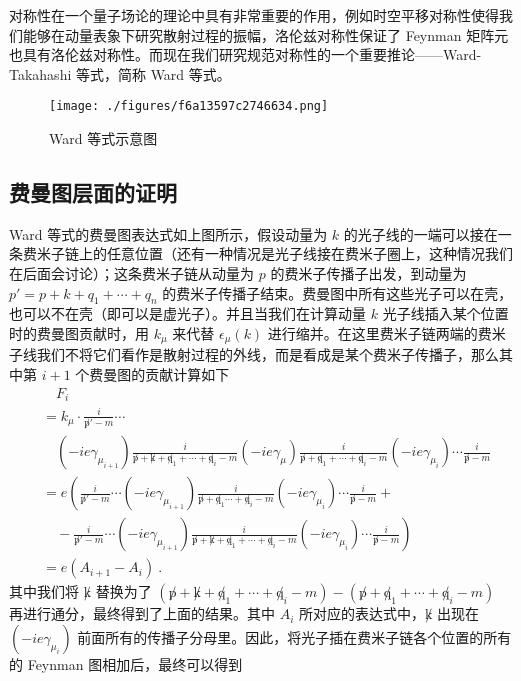 对称性在一个量子场论的理论中具有非常重要的作用，例如时空平移对称性使得我们能够在动量表象下研究散射过程的振幅，洛伦兹对称性保证了 Feynman 矩阵元也具有洛伦兹对称性。而现在我们研究规范对称性的一个重要推论——Ward-Takahashi 等式，简称 Ward 等式。

\begin{figure}[ht]
\centering
\texttt{[image: ./figures/f6a13597c2746634.png]}
\caption{Ward 等式示意图} \label{fig_ward_4}
\end{figure}

\subsection{费曼图层面的证明}
Ward 等式的费曼图表达式如上图所示，假设动量为 $k$ 的光子线的一端可以接在一条费米子链上的任意位置（还有一种情况是光子线接在费米子圈上，这种情况我们在后面会讨论）；这条费米子链从动量为 $p$ 的费米子传播子出发，到动量为 $p'=p+k+q_1+\cdots+q_n$ 的费米子传播子结束。费曼图中所有这些光子可以在壳，也可以不在壳（即可以是虚光子）。并且当我们在计算动量 $k$ 光子线插入某个位置时的费曼图贡献时，用 $k_\mu$ 来代替 $\epsilon_\mu(k)$ 进行缩并。在这里费米子链两端的费米子线我们不将它们看作是散射过程的外线，而是看成是某个费米子传播子，那么其中第 $i+1$ 个费曼图的贡献计算如下
\begin{equation}
\begin{aligned}
&\quad F_i\\
&=k_\mu\cdot \frac{i}{\not p'-m}\cdots\\
  &\quad (-ie\gamma_{\mu_{i+1}})\frac{i}{\not p+\not k+\not q_1+\cdots+\not q_i-m}
(-ie\gamma_\mu)
\frac{i}{\not p+\not q_1+\cdots+\not q_i - m}(-ie\gamma_{\mu_i})\cdots \frac{i}{\not p - m}
\\
&=
e\left(\frac{i}{\not p'-m}\cdots(-ie\gamma_{\mu_{i+1}})\frac{i}{\not p+\not q_1\cdots + \not q_i - m}(-ie\gamma_{\mu_i})\cdots \frac{i}{\not p-m}+\right.\\
&\quad-\left.\frac{i}{\not p'-m}\cdots(-ie\gamma_{\mu_{i+1}})\frac{i}{\not p+\not k+\not q_1+\cdots + \not q_i-m}(-ie\gamma_{\mu_i}) \cdots \frac{i}{\not p-m}\right)
\\
&=e(A_{i+1}-A_i)~.
\end{aligned}
\end{equation}
其中我们将 $\not k$ 替换为了 $(\not p+\not k+\not q_1+\cdots + \not q_i-m) - (\not p+\not q_1+\cdots + \not q_i-m)$ 再进行通分，最终得到了上面的结果。其中 $A_i$ 所对应的表达式中，$\not k$ 出现在 $(-ie\gamma_{\mu_{i}})$ 前面所有的传播子分母里。因此，将光子插在费米子链各个位置的所有的 Feynman 图相加后，最终可以得到
